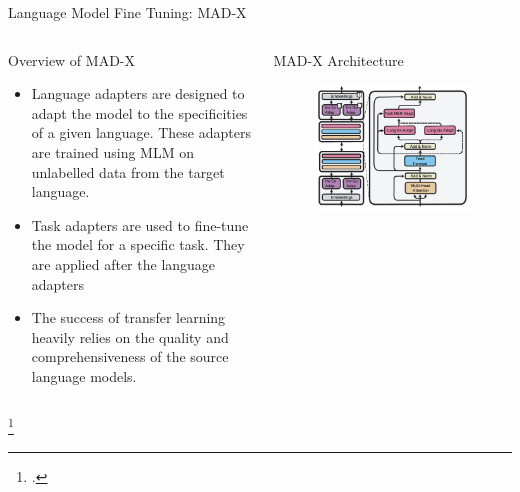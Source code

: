 \documentclass{beamer}
\begin{document}
	\begin{frame}{Language Model Fine Tuning: MAD-X}
		\begin{columns}
			\begin{block}{\scriptsize Overview of MAD-X}\scriptsize
				\begin{itemize}
					\item Language adapters are designed to adapt the model to the specificities of a given language. These adapters are trained using MLM on unlabelled data from the target language. 
					\item Task adapters are used to fine-tune the model for a specific task. They are applied after the language adapters
					\item The success of transfer learning heavily relies on the quality and comprehensiveness of the source language models.
				\end{itemize}		  
			\end{block}
			\begin{block}{\scriptsize MAD-X Architecture\footnotemark}
				\begin{figure}
					\centering
					\includegraphics[width=\textwidth]{lang-task-adapter}
				\end{figure}
			\end{block}
		\end{columns}\footcitetext{pfeiffer2020mad}
	\end{frame}
	
\end{document}
